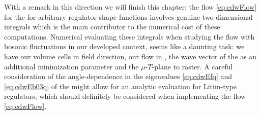 With a remark in this direction we will finish this chapter: the flow \cref{eq:cdwFlow} for the \cdw{} for arbitrary regulator shape functions involves genuine two-dimensional integrals which is the main contributor to the numerical cost of these \mf{} computations. Numerical evaluating these integrals when studying the \frg{} flow with bosonic fluctuations in our developed \cfd{} context, seems like a daunting task: we have our volume cells in field direction, our flow in \rgtime{}, the wave vector of the \cdw{} as an additional minimization parameter and the $\mu$-$T$-plane to raster. A careful consideration of the angle-dependence in the eigenvalues \eqref{eq:cdwEfq} and \eqref{eq:cdwEb03q} of the \cdw{} might allow for an analytic evaluation for Litim-type regulators, which should definitely be considered when implementing the \lpa{} flow \cref{eq:cdwFlow}.
